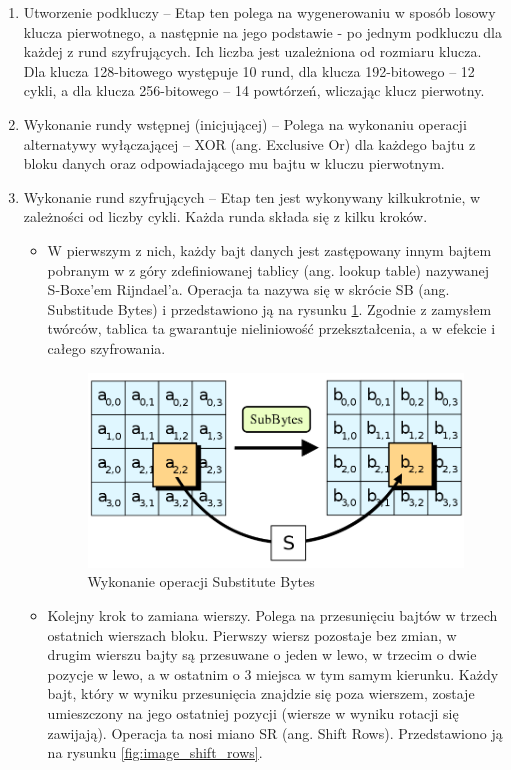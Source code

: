\begin{enumerate}
\item  Utworzenie podkluczy – Etap ten polega na wygenerowaniu w sposób losowy klucza pierwotnego, a następnie na jego podstawie - po jednym podkluczu dla każdej z rund szyfrujących. Ich liczba jest uzależniona od rozmiaru klucza. Dla klucza 128-bitowego występuje 10 rund, dla klucza 192-bitowego – 12 cykli, a dla klucza 256-bitowego – 14 powtórzeń, wliczając klucz pierwotny.

\item Wykonanie rundy wstępnej (inicjującej) – Polega na wykonaniu operacji alternatywy wyłączającej – XOR (ang. Exclusive Or) dla każdego bajtu z bloku danych oraz odpowiadającego mu bajtu w kluczu pierwotnym.

\item Wykonanie rund szyfrujących – Etap ten jest wykonywany kilkukrotnie, w zależności od liczby cykli. Każda runda składa się z kilku kroków. 

	\begin{itemize}
	\item W pierwszym z nich, każdy bajt danych jest zastępowany innym bajtem pobranym w z góry zdefiniowanej tablicy (ang. lookup table) nazywanej S-Boxe’em Rijndael’a. Operacja ta nazywa się w skrócie SB (ang. Substitude Bytes) i przedstawiono ją na rysunku \ref{fig:image_substitute_bytes}. Zgodnie z zamysłem twórców, tablica ta gwarantuje nieliniowość przekształcenia, a w efekcie i całego szyfrowania.
	
	\begin{figure}[h]
		\centering
		\includegraphics[width=10cm]{img/com_security/800px-AES-SubBytes.png}
		\caption{Wykonanie operacji Substitute Bytes}
		\label{fig:image_substitute_bytes}
	\end{figure}

	\item  Kolejny krok to zamiana wierszy. Polega na przesunięciu bajtów w trzech ostatnich wierszach bloku. Pierwszy wiersz pozostaje bez zmian, w drugim wierszu bajty są przesuwane o jeden w lewo, w trzecim o dwie pozycje w lewo, a w ostatnim o 3 miejsca w tym samym kierunku. Każdy bajt, który w wyniku przesunięcia znajdzie się poza wierszem, zostaje umieszczony na jego ostatniej pozycji (wiersze w wyniku rotacji się zawijają). Operacja ta nosi miano SR (ang. Shift Rows). Przedstawiono ją na rysunku \ref{fig:image_shift_rows}.
	

\end{itemize}
\end{enumerate}
